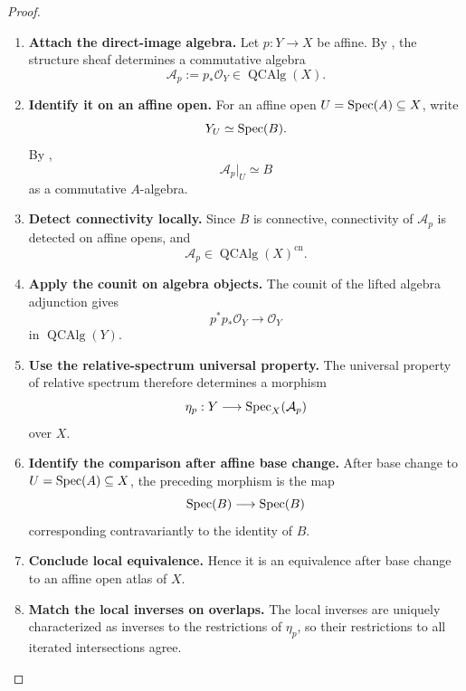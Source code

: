 \begin{proof}
\leavevmode
\begin{enumerate}[label=\textup{(\arabic*)}]
    \item \textbf{Attach the direct-image algebra.}
    Let \(p:Y\to X\) be affine. By
    , the structure sheaf determines
    a commutative algebra
    \[
        \mathcal A_p
        :=
        p_*\mathcal O_Y
        \in
        \operatorname{QCAlg}(X).
    \]

    \item \textbf{Identify it on an affine open.}
    For an affine open \(U=\operatorname{Spec}(A)\subseteq X\), write
    \[
        Y_U\simeq\operatorname{Spec}(B).
    \]
    By ,
    \[
        \mathcal A_p|_U\simeq B
    \]
    as a commutative \(A\)-algebra.

    \item \textbf{Detect connectivity locally.}
    Since \(B\) is connective,
    connectivity of \(\mathcal A_p\) is detected on affine opens, and
    \[
        \mathcal A_p\in\operatorname{QCAlg}(X)^{\mathrm{cn}}.
    \]

    \item \textbf{Apply the counit on algebra objects.}
    The counit of the lifted algebra adjunction gives
    \[
        p^*p_*\mathcal O_Y
        \longrightarrow
        \mathcal O_Y
    \]
    in \(\operatorname{QCAlg}(Y)\).

    \item \textbf{Use the relative-spectrum universal property.}
    The universal property of relative
    spectrum therefore determines a morphism
    \[
        \eta_p:
        Y\longrightarrow\operatorname{Spec}_X(\mathcal A_p)
    \]
    over \(X\).

    \item \textbf{Identify the comparison after affine base change.}
    After base change to \(U=\operatorname{Spec}(A)\subseteq X\), the preceding morphism is
    the map
    \[
        \operatorname{Spec}(B)\longrightarrow\operatorname{Spec}(B)
    \]
    corresponding contravariantly to the identity of \(B\).

    \item \textbf{Conclude local equivalence.}
    Hence it is an
    equivalence after base change to an affine open atlas of \(X\).

    \item \textbf{Match the local inverses on overlaps.}
    The
    local inverses are uniquely characterized as inverses to the restrictions
    of \(\eta_p\), so their restrictions to all iterated intersections agree.


\end{enumerate}
\end{proof}
